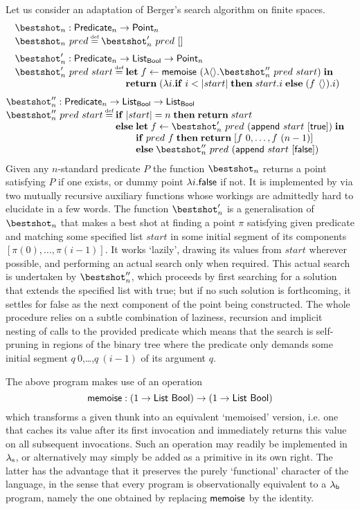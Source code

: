\documentclass[12pt,phd,lfcs,twoside,openright,logo,leftchapter,normalheadings]{infthesis}
\theoremstyle{plain}
\theoremstyle{definition}
\begin{document}
Let us consider an adaptation of Berger's search algorithm on finite
spaces.
%
\[
    \bl
    \bestshot_n: \Predicate_n \to \Point_n\\
    \bestshot_n~pred \defas \bestshot'_n~pred~\nil \medskip\\

    \bestshot'_n : \Predicate_n \to \List_\Bool \to \Point_n\\
    \bestshot'_n~pred~start \defas
     \ba[t]{@{}l}
       \Let\; f \revto \dec{memoise}~(\lambda\Unit. \bestshot''_n~pred~start)\; \In\\
       \Return\;(\lambda i. \If\; i < |start| \;\Then\; start.i \;\Else\; (f~\Unit).i)
       \ea
   \el
\]
%
\[
  \bl
    \bestshot''_n : \Predicate_n \to \List_\Bool \to \List_\Bool\\
    \bestshot''_n~pred~start \defas
     \ba[t]{@{}l}
       \If\; |start| = n \;\Then\; \Return\; start\\
       \Else\;
       \ba[t]{@{}l}
         \Let\; f \revto \bestshot'_n~pred~(\dec{append}~start~[\True])\;\In\\
         \If\; pred~f \;\Then\; \Return\; [f~0,\dots,f~(n-1)]\\
         \Else\; \bestshot''_n~pred~(\dec{append}~start~[\False])
       \ea
     \ea
   \el
\]%
%
Given any $n$-standard predicate $P$ the function $\bestshot_n$
returns a point satisfying $P$ if one exists, or dummy point
$\lambda i.\mathsf{false}$ if not. It is implemented by via two mutually
recursive auxiliary functions whose workings are admittedly hard to
elucidate in a few words. The function $\bestshot'_n$ is a
generalisation of $\bestshot_n$ that makes a best shot at finding a
point $\pi$ satisfying given predicate and matching some specified
list $start$ in some initial segment of its components
$[\pi(0),\dots,\pi(i-1)]$. It works `lazily', drawing its values from
$start$ wherever possible, and performing an actual search only when
required. This actual search is undertaken by $\bestshot''_n$, which
proceeds by first searching for a solution that extends the specified
list with true; but if no such solution is forthcoming, it settles for
false as the next component of the point being constructed. The whole
procedure relies on a subtle combination of laziness, recursion and
implicit nesting of calls to the provided predicate which means that
the search is self-pruning in regions of the binary tree where the
predicate only demands some initial segment $q~0$,\dots,$q~(i-1)$ of
its argument $q$.

The above program makes use of an operation
%
\[
    \mathsf{memoise} : (1 \to \mathsf{List}~\mathsf{Bool}) \to (1 \to \mathsf{List}~\mathsf{Bool})
\]%
%
which transforms a given thunk into an equivalent `memoised' version,
i.e. one that caches its value after its first invocation and
immediately returns this value on all subsequent invocations. Such an
operation may readily be implemented in $\lambda_{\textrm{\normalfont s}}$, or alternatively
may simply be added as a primitive in its own right.
The latter has the advantage that it preserves the purely `functional'
character of the language, in the sense that every program is
observationally equivalent to a $\lambda_{\mathsf{b}}$ program, namely the one
obtained by replacing $\mathsf{memoise}$ by the identity.
\end{document}
